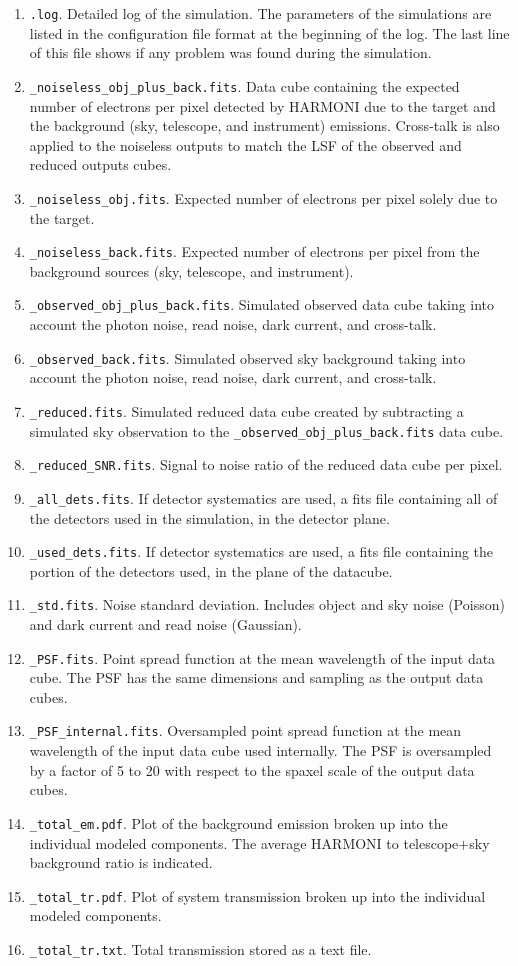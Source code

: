 \documentclass[12pt]{report}
\begin{document}
\begin{enumerate}
\setlength\itemsep{-0.5ex}
\item \texttt{.log}. Detailed log of the simulation. The parameters of the simulations are listed in the configuration file format at the beginning of the log. The last line of this file shows if any problem was found during the simulation.
\item \texttt{\_noiseless\_obj\_plus\_back.fits}. Data cube containing the expected number of electrons per pixel detected by HARMONI due to the target and the background (sky, telescope, and instrument) emissions. Cross-talk is also applied to the noiseless outputs to match the LSF of the observed and reduced outputs cubes.
\item \texttt{\_noiseless\_obj.fits}. Expected number of electrons per pixel solely due to the target.
\item \texttt{\_noiseless\_back.fits}. Expected number of electrons per pixel from the background sources (sky, telescope, and instrument).
\item \texttt{\_observed\_obj\_plus\_back.fits}. Simulated observed data cube taking into account the photon noise, read noise, dark current, and cross-talk.
\item \texttt{\_observed\_back.fits}. Simulated observed sky background taking into account the photon noise, read noise, dark current, and cross-talk.
\item \texttt{\_reduced.fits}. Simulated reduced data cube created by subtracting a simulated sky observation  to the \texttt{\_observed\_obj\_plus\_back.fits} data cube.
\item \texttt{\_reduced\_SNR.fits}. Signal to noise ratio of the reduced data cube per pixel.
\item \texttt{\_all\_dets.fits}. If detector systematics are used, a fits file containing all of the detectors used in the simulation, in the detector plane.
\item \texttt{\_used\_dets.fits}. If detector systematics are used, a fits file containing the portion of the detectors used, in the plane of the datacube.
\item \texttt{\_std.fits}. Noise standard deviation. Includes object and sky noise (Poisson) and dark current and read noise (Gaussian).
\item \texttt{\_PSF.fits}. Point spread function at the mean wavelength of the input data cube. The PSF has the same dimensions and sampling as the output data cubes.
\item \texttt{\_PSF\_internal.fits}. Oversampled point spread function at the mean wavelength of the input data cube used internally. The PSF is oversampled by a factor of 5 to 20 with respect to the spaxel scale of the output data cubes.
\item \texttt{\_total\_em.pdf}. Plot of the background emission broken up into the individual modeled components. The average HARMONI to telescope$+$sky background ratio is indicated.
\item \texttt{\_total\_tr.pdf}. Plot of system transmission broken up into the individual modeled components.
\item \texttt{\_total\_tr.txt}. Total transmission stored as a text file.


\end{enumerate}
\end{document}

